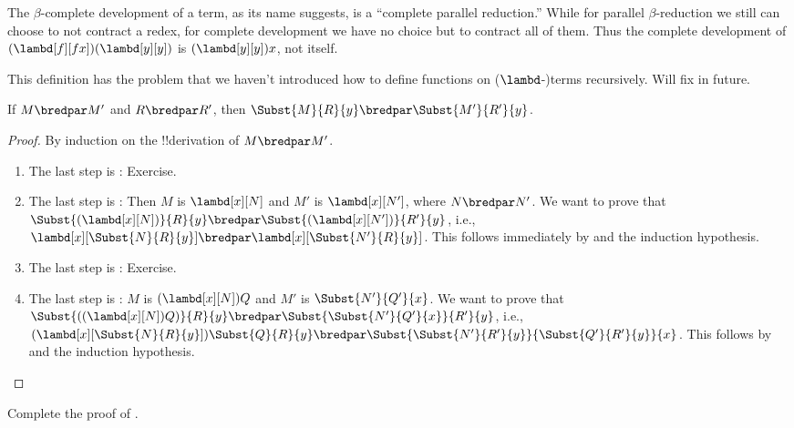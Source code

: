 \documentclass[../../../include/open-logic-section]{subfiles}
\begin{document}
The $\beta$-complete development of a term, as its name suggests, is a
``complete parallel reduction.'' While for parallel $\beta$-reduction we still
can choose to not contract a redex, for complete development we have
no choice but to contract all of them. Thus the complete development
of $(\lambd[f][fx])(\lambd[y][y])$ is $(\lambd[y][y])x$, not itself.

\begin{editorial}
  This definition has the problem that we haven't introduced how to
  define functions on ($\lambd$-)terms recursively. Will fix in future.
\end{editorial}

\begin{lem}
  If $M \bredpar M'$ and $R \bredpar R'$, then $\Subst{M}{R}{y}
  \bredpar \Subst{M'}{R'}{y}$.
\end{lem}

\begin{proof}
  By induction on the !!{derivation} of $M \bredpar M'$.
  \begin{enumerate}
    \item The last step is : Exercise.
    \item The last step is : Then $M$ is 
      $\lambd[x][N]$ and $M'$ is $\lambd[x][N']$,
      where $N \bredpar N'$. We want to prove that
      $\Subst{(\lambd[x][N])}{R}{y} \bredpar
      \Subst{(\lambd[x][N'])}{R'}{y}$, i.e.,
      $\lambd[x][\Subst{N}{R}{y}] \bredpar
      \lambd[x][\Subst{N'}{R}{y}]$. This follows immediately by
       and the induction hypothesis.
    \item The last step is : Exercise.
    \item The last step is : $M$ is
      $(\lambd[x][N])Q$ and $M'$ is $\Subst{N'}{Q'}{x}$. We want to
      prove that $\Subst{((\lambd[x][N])Q)}{R}{y} \bredpar
      \Subst{\Subst{N'}{Q'}{x}}{R'}{y}$, i.e.,
      $(\lambd[x][\Subst{N}{R}{y}])\Subst{Q}{R}{y} \bredpar
      \Subst{\Subst{N'}{R'}{y}}{\Subst{Q'}{R'}{y}}{x}$. This follows
      by  and the induction hypothesis.
  \end{enumerate}
\end{proof}

\begin{prob}
  Complete the proof of .
\end{prob}
\end{document}
